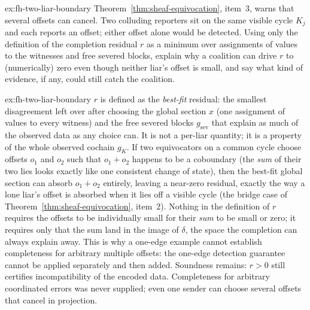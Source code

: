 \documentclass[11pt,a4paper]{article}
\theoremstyle{definition}
\theoremstyle{remark}
\begin{document}
\begin{pdexercise}[kind=Open,rating=3]{ex:fh-two-liar-boundary}
Theorem~\ref{thm:sheaf-equivocation}, item~3, warns that several offsets can cancel. Two colluding reporters sit on the same visible cycle $K_j$ and each reports an offset; either offset alone would be detected. Using only the definition of the completion residual $r$ as a minimum over assignments of values to the witnesses and free severed blocks, explain why a coalition can drive $r$ to (numerically) zero even though neither liar's offset is small, and say what kind of evidence, if any, could still catch the coalition.
\end{pdexercise}
\begin{pdsolution}{ex:fh-two-liar-boundary}
$r$ is defined as the \emph{best-fit} residual: the smallest disagreement left over after choosing the global section $x$ (one assignment of values to every witness) and the free severed blocks $g_{\mathrm{sev}}$ that explain as much of the observed data as any choice can. It is not a per-liar quantity; it is a property of the whole observed cochain $g_K$. If two equivocators on a common cycle choose offsets $o_1$ and $o_2$ such that $o_1+o_2$ happens to be a coboundary (the \emph{sum} of their two lies looks exactly like one consistent change of state), then the best-fit global section can absorb $o_1+o_2$ entirely, leaving a near-zero residual, exactly the way a lone liar's offset is absorbed when it lies off a visible cycle (the bridge case of Theorem~\ref{thm:sheaf-equivocation}, item~2). Nothing in the definition of $r$ requires the offsets to be individually small for their \emph{sum} to be small or zero; it requires only that the sum land in the image of $\delta$, the space the completion can always explain away. This is why a one-edge example cannot establish completeness for arbitrary multiple offsets: the one-edge detection guarantee cannot be applied separately and then
added. Soundness remains: $r>0$ still certifies incompatibility of the encoded
data. Completeness for arbitrary coordinated errors was never supplied; even
one sender can choose several offsets that cancel in projection.


\end{pdsolution}
\end{document}
